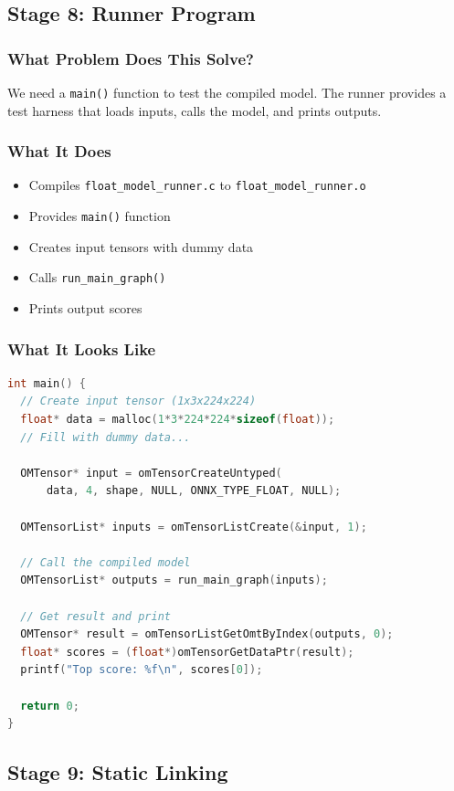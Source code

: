 \documentclass[12pt,a4paper]{article}
\begin{document}
\subsection{Stage 8: Runner Program}

\subsubsection{What Problem Does This Solve?}
We need a \texttt{main()} function to test the compiled model. The runner provides a test harness that loads inputs, calls the model, and prints outputs.

\subsubsection{What It Does}
\begin{itemize}
  \item Compiles \texttt{float\_model\_runner.c} to \texttt{float\_model\_runner.o}
  \item Provides \texttt{main()} function
  \item Creates input tensors with dummy data
  \item Calls \texttt{run\_main\_graph()}
  \item Prints output scores
\end{itemize}

\subsubsection{What It Looks Like}
\begin{lstlisting}[language=c, caption=Runner Program Concept]
int main() {
  // Create input tensor (1x3x224x224)
  float* data = malloc(1*3*224*224*sizeof(float));
  // Fill with dummy data...
  
  OMTensor* input = omTensorCreateUntyped(
      data, 4, shape, NULL, ONNX_TYPE_FLOAT, NULL);
  
  OMTensorList* inputs = omTensorListCreate(&input, 1);
  
  // Call the compiled model
  OMTensorList* outputs = run_main_graph(inputs);
  
  // Get result and print
  OMTensor* result = omTensorListGetOmtByIndex(outputs, 0);
  float* scores = (float*)omTensorGetDataPtr(result);
  printf("Top score: %f\n", scores[0]);
  
  return 0;
}
\end{lstlisting}

\subsection{Stage 9: Static Linking}
\end{document}
